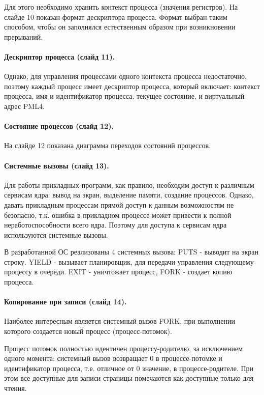 \documentclass[12pt]{article}
\begin{document}
Для этого необходимо хранить контекст процесса (значения регистров). На слайде 10 показан формат
дескриптора процесса. Формат выбран таким способом, чтобы он заполнялся естественным образом при
возникновении прерываний.

\paragraph{Дескриптор процесса (слайд 11).}
Однако, для управления процессами одного контекста процесса недостаточно, поэтому каждый
процесс имеет дескриптор процесса, который включает: контекст процесса, имя и идентификатор процесса,
текущее состояние, и виртуальный адрес PML4.

\paragraph{Состояние процессов (слайд 12).}
На слайде 12 показана диаграмма переходов состояний процессов.

\paragraph{Системные вызовы (слайд 13).}
Для работы прикладных программ, как правило, необходим доступ к различным сервисам ядра: вывод
на экран, выделение памяти, создание процессов. Однако, давать прикладным процессам прямой доступ
к данным возможностям не безопасно, т.к. ошибка в прикладном процессе может привести к полной
неработоспособности всего ядра. Поэтому для доступа к сервисам ядра используются системные вызовы.

В разработанной ОС реализованы 4 системных вызова: PUTS - выводит на экран строку.
YIELD - вызывает планировщик, для передачи управления следующему процессу в очереди.
EXIT - уничтожает процесс, FORK - создает копию процесса.

\paragraph{Копирование при записи (слайд 14).}
Наиболее интересным является системный вызов FORK, при выполнении которого создается новый процесс (процесс-потомок).

Процесс потомок полностью идентичен процессу-родителю, за исключением одного момента: системный вызов
возвращает 0 в процессе-потомке и идентификатор процесса, т.е. отличное от 0 значение, в процессе-родителе.
При этом все доступные для записи страницы помечаются как доступные только для чтения.
\end{document}
